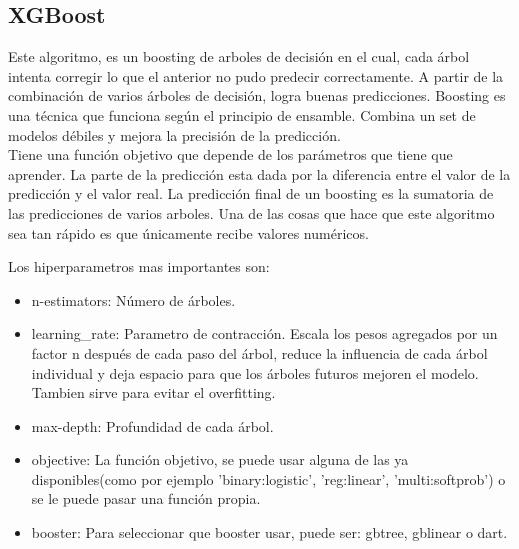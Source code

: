 \documentclass[12pt,a4paper]{article}
\begin{document}
\subsection{XGBoost}
Este algoritmo, es un boosting de arboles de decisión en el cual, cada árbol intenta corregir lo que el anterior no pudo predecir correctamente. A partir de la combinación de varios árboles de decisión, logra buenas predicciones. Boosting es una técnica que funciona según el principio de ensamble. Combina un set de modelos débiles y mejora la precisión de la predicción.\\
Tiene una función objetivo que depende de los parámetros que tiene que aprender. La parte de la predicción esta dada por la diferencia entre el valor de la predicción y el valor real. La predicción final de un boosting es la sumatoria de las predicciones de varios arboles. Una de las cosas que hace que este algoritmo sea tan rápido es que únicamente recibe valores numéricos.
 
Los hiperparametros mas importantes son:
 \begin{itemize}
    \item n-estimators: Número de árboles.
    
    \item learning\_rate: Parametro de contracción. Escala los pesos agregados por un factor n  después de cada paso del árbol, reduce la influencia de cada árbol individual y deja espacio para que los  árboles futuros mejoren el modelo. Tambien sirve para evitar el overfitting.
    
    \item max-depth: Profundidad de cada árbol.
    
    \item objective: La función objetivo, se puede usar alguna de las ya disponibles(como por ejemplo 'binary:logistic', 'reg:linear', 'multi:softprob') o se le puede pasar una función propia.
    
    \item booster: Para seleccionar que booster usar, puede ser: gbtree, gblinear o dart.
    
\end{itemize}
\end{document}
